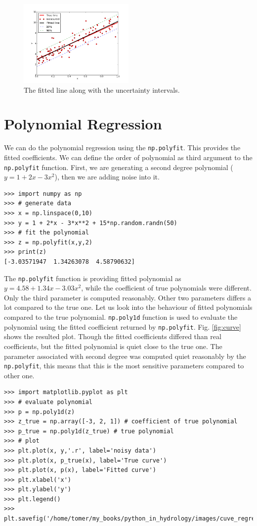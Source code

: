 \documentclass[10pt]{book}
\begin{document}
{\beforefig
\begin{figure}[h!]
  \centering
    \includegraphics[width=0.5\textwidth]{images/lin_regress.png}
  \caption{The fitted line along with the uncertainty intervals.}
   \label{fig:line}
\end{figure}
\afterfig

\section{Polynomial Regression}
We can do the polynomial regression using the \verb"np.polyfit". This provides the fitted coefficients. We can define the order of polynomial as third argument to the \verb"np.polyfit" function. First, we are generating a second degree polynomial ($y=1+2x-3x^2$),
then we are adding noise into it. 
\beforeverb \begin{verbatim}
>>> import numpy as np
>>> # generate data
>>> x = np.linspace(0,10)
>>> y = 1 + 2*x - 3*x**2 + 15*np.random.randn(50)
>>> # fit the polynomial
>>> z = np.polyfit(x,y,2)
>>> print(z)
[-3.03571947  1.34263078  4.58790632]
\end{verbatim} \afterverb
The \verb"np.polyfit" function is providing fitted polynomial as $y=4.58+1.34x-3.03x^2$, while the coefficient of true polynomials were different. Only the third parameter is computed reasonably. Other two parameters differs a lot compared to the true one. Let us look into the behaviour of fitted polynomials compared to the true polynomial. \verb"np.poly1d" function is used to evaluate the polynomial using the fitted coefficient returned by \verb"np.polyfit". Fig. \ref{fig:curve} shows the resulted plot. Though the fitted coefficients differed than real coefficients, but the fitted polynomial is quiet close to the true one. The parameter associated with second degree was computed quiet reasonably by the \verb"np.polyfit", this means that this is the most sensitive parameters compared to other one.

\beforeverb \begin{verbatim}
>>> import matplotlib.pyplot as plt
>>> # evaluate polynomial 
>>> p = np.poly1d(z)
>>> z_true = np.array([-3, 2, 1]) # coefficient of true polynomial
>>> p_true = np.poly1d(z_true) # true polynomial
>>> # plot
>>> plt.plot(x, y,'.r', label='noisy data')
>>> plt.plot(x, p_true(x), label='True curve')
>>> plt.plot(x, p(x), label='Fitted curve')
>>> plt.xlabel('x')
>>> plt.ylabel('y')
>>> plt.legend()
>>> plt.savefig('/home/tomer/my_books/python_in_hydrology/images/cuve_regre.png')
\end{verbatim} \afterverb

}
\end{document}
